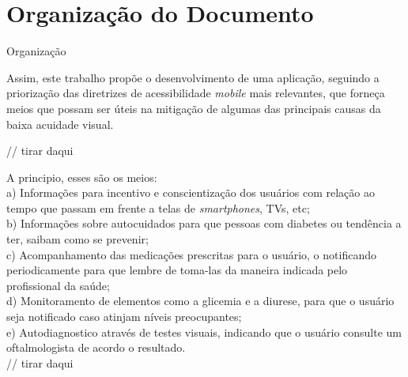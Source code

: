 \section{Organização do Documento}

Organização




Assim, este trabalho propõe o desenvolvimento de uma aplicação, seguindo a priorização das diretrizes de acessibilidade \textit{mobile} mais relevantes, que forneça meios que possam ser úteis na mitigação de algumas das principais causas da baixa acuidade visual.

// tirar daqui

A principio, esses são os meios:\\
a) Informações para incentivo e conscientização dos usuários com relação ao tempo que passam em frente a telas de \textit{smartphones}, TVs, etc;\\
b) Informações sobre autocuidados para que pessoas com diabetes ou tendência a ter, saibam como se prevenir;\\
c) Acompanhamento das medicações prescritas para o usuário, o notificando periodicamente para que lembre de toma-las da maneira indicada pelo profissional da saúde;\\
d) Monitoramento de elementos como a glicemia e a diurese, para que o usuário seja notificado caso atinjam níveis preocupantes;\\
e) Autodiagnostico através de testes visuais, indicando que o usuário consulte um oftalmologista de acordo o resultado.\\
// tirar daqui